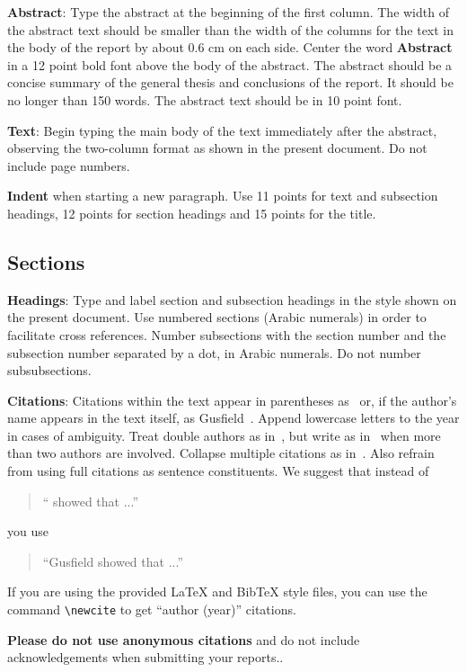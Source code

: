 \documentclass[11pt]{article}
\begin{document}
{\bf Abstract}: Type the abstract at the beginning of the first
column. The width of the abstract text should be smaller than the
width of the columns for the text in the body of the report by about
0.6 cm on each side. Center the word {\bf Abstract} in a 12 point bold
font above the body of the abstract. The abstract should be a concise
summary of the general thesis and conclusions of the report. It should
be no longer than 150 words. The abstract text should be in 10 point font.

{\bf Text}: Begin typing the main body of the text immediately after
the abstract, observing the two-column format as shown in 
the present document. Do not include page numbers.

{\bf Indent} when starting a new paragraph. Use 11 points for text and 
subsection headings, 12 points for section headings and 15 points for
the title. 

\subsection{Sections}

{\bf Headings}: Type and label section and subsection headings in the
style shown on the present document.  Use numbered sections (Arabic
numerals) in order to facilitate cross references. Number subsections
with the section number and the subsection number separated by a dot,
in Arabic numerals. Do not number subsubsections.

{\bf Citations}: Citations within the text appear in parentheses
as~\cite{Gusfield:97} or, if the author's name appears in the text
itself, as Gusfield~.  Append lowercase letters
to the year in cases of ambiguity.  Treat double authors as
in~\cite{Aho:72}, but write as in~\cite{Chandra:81} when more than two
authors are involved. Collapse multiple citations as
in~\cite{Gusfield:97,Aho:72}. Also refrain from using full citations
as sentence constituents. We suggest that instead of
\begin{quote}
  ``\cite{Gusfield:97} showed that ...''
\end{quote}
you use
\begin{quote}
``Gusfield    showed that ...''
\end{quote}

If you are using the provided \LaTeX{} and Bib\TeX{} style files, you
can use the command \verb|\newcite| to get ``author (year)'' citations.

\textbf{Please do not use anonymous citations} and do not include
acknowledgements when submitting your reports..
\end{document}
